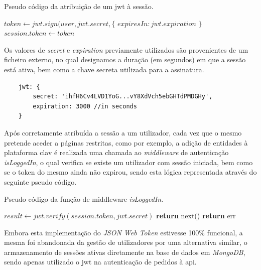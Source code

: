 \begin{algorithm}
    \caption{Pseudo código da atribuição de um \gls{jwt} à sessão.}
    \label{algoritmoJWT1}
    \begin{algorithmic}[1]
        \State $token \gets jwt.sign({user}, jwt.secret, \{$
        \State \indent $expiresIn : jwt.expiration$
        \State $\}$
        \State $session.token \gets token$
    \EndFunction
    \end{algorithmic}
\end{algorithm}

Os valores de \emph{secret} e \emph{expiration} previamente utilizados são provenientes de um ficheiro externo, no qual designamos a duração (em segundos) em que a sessão está ativa, bem como a chave secreta utilizada para a assinatura.

\begin{verbatim}
    jwt: {
        secret: 'ihfH6Cv4LVD1YoG...vY8XdVch5ebGHTdPMDGHy',
        expiration: 3000 //in seconds
    }
\end{verbatim}

Após corretamente atribuída a sessão a um utilizador, cada vez que o mesmo pretende aceder a páginas restritas, como por exemplo, a adição de entidades à plataforma \gls{clav} é realizada uma chamada ao \emph{middleware} de autenticação \emph{isLoggedIn}, o qual verifica se existe um utilizador com sessão iniciada, bem como se o token do mesmo ainda não expirou, sendo esta lógica representada através do seguinte pseudo código.

\begin{algorithm}
    \caption{Pseudo código da função  de middleware \emph{isLoggedIn}.}
    \begin{algorithmic}[1]
        \State $result \gets jwt.verify(session.token, jwt.secret)$
                \State \textbf{return} next()
            \Else
                \State \textbf{return} err
            \EndIf
        \EndIf
    \EndFunction
    \end{algorithmic}
\end{algorithm}

Embora esta implementação do \emph{JSON Web Token} estivesse 100\% funcional, a mesma foi abandonada da gestão de utilizadores por uma alternativa similar, o armazenamento de sessões ativas diretamente na base de dados em \emph{MongoDB}, sendo apenas utilizado o \gls{jwt} na autenticação de pedidos à \gls{api}.

